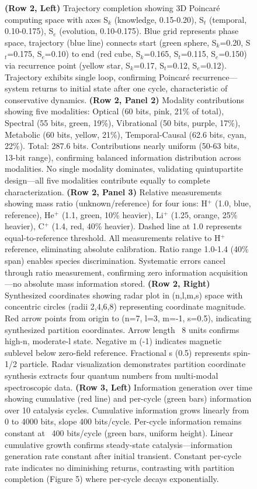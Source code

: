 \begin{figure}[htbp]
{    \textbf{(Row 2, Left)} Trajectory completion showing 3D Poincaré computing space with axes S$_k$ (knowledge, 0.15-0.20), S$_t$ (temporal, 0.10-0.175), S$_e$ (evolution, 0.10-0.175). Blue grid represents phase space, trajectory (blue line) connects start (green sphere, S$_k$=0.20, S$_t$=0.175, S$_e$=0.10) to end (red cube, S$_k$=0.165, S$_t$=0.115, S$_e$=0.150) via recurrence point (yellow star, S$_k$=0.17, S$_t$=0.12, S$_e$=0.12). Trajectory exhibits single loop, confirming Poincaré recurrence—system returns to initial state after one cycle, characteristic of conservative dynamics. 
    \textbf{(Row 2, Panel 2)} Modality contributions showing five modalities: Optical (60 bits, pink, 21\% of total), Spectral (55 bits, green, 19\%), Vibrational (50 bits, purple, 17\%), Metabolic (60 bits, yellow, 21\%), Temporal-Causal (62.6 bits, cyan, 22\%). Total: 287.6 bits. Contributions nearly uniform (50-63 bits, 13-bit range), confirming balanced information distribution across modalities. No single modality dominates, validating quintupartite design—all five modalities contribute equally to complete characterization. 
    \textbf{(Row 2, Panel 3)} Relative measurements showing mass ratio (unknown/reference) for four ions: H$^+$ (1.0, blue, reference), He$^+$ (1.1, green, 10\% heavier), Li$^+$ (1.25, orange, 25\% heavier), C$^+$ (1.4, red, 40\% heavier). Dashed line at 1.0 represents equal-to-reference threshold. All measurements relative to H$^+$ reference, eliminating absolute calibration. Ratio range 1.0-1.4 (40\% span) enables species discrimination. Systematic errors cancel through ratio measurement, confirming zero information acquisition—no absolute mass information stored. 
    \textbf{(Row 2, Right)} Synthesized coordinates showing radar plot in (n,l,m,s) space with concentric circles (radii 2,4,6,8) representing coordinate magnitude. Red arrow points from origin to (n=7, l=3, m=-1, s=0.5), indicating synthesized partition coordinates. Arrow length ~8 units confirms high-n, moderate-l state. Negative m (-1) indicates magnetic sublevel below zero-field reference. Fractional s (0.5) represents spin-1/2 particle. Radar visualization demonstrates partition coordinate synthesis extracts four quantum numbers from multi-modal spectroscopic data. 
    \textbf{(Row 3, Left)} Information generation over time showing cumulative (red line) and per-cycle (green bars) information over 10 catalysis cycles. Cumulative information grows linearly from 0 to 4000 bits, slope 400 bits/cycle. Per-cycle information remains constant at ~400 bits/cycle (green bars, uniform height). Linear cumulative growth confirms steady-state catalysis—information generation rate constant after initial transient. Constant per-cycle rate indicates no diminishing returns, contrasting with partition completion (Figure 5) where per-cycle decays exponentially. 
}
\end{figure}
